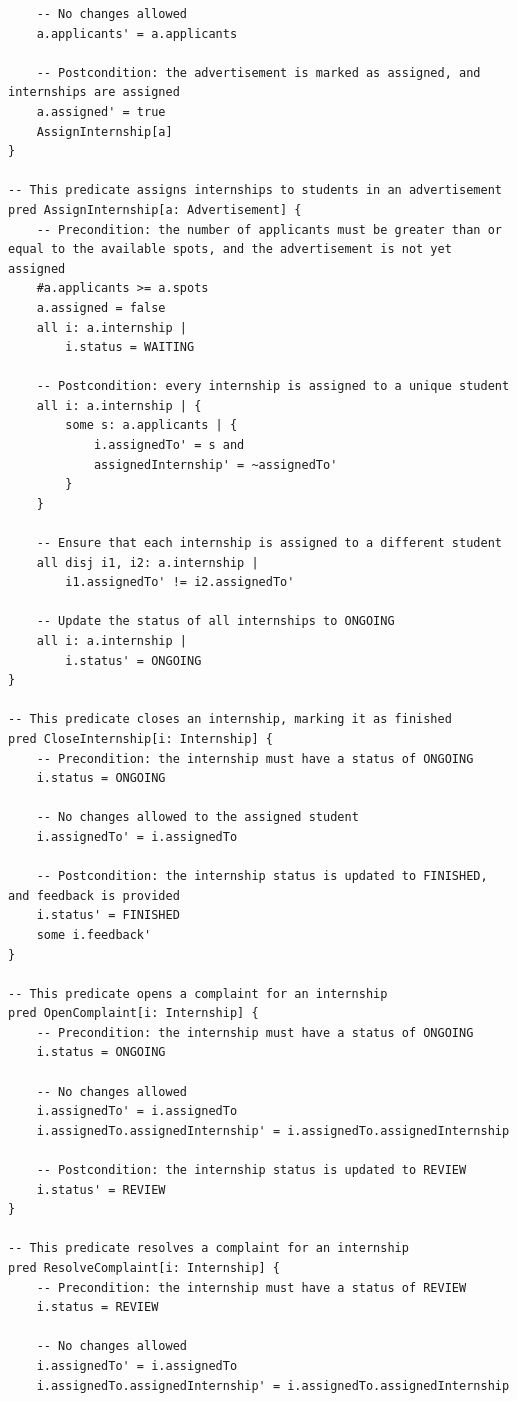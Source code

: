 \begin{lstlisting}
    -- No changes allowed 
    a.applicants' = a.applicants

    -- Postcondition: the advertisement is marked as assigned, and internships are assigned
    a.assigned' = true
    AssignInternship[a]
}

-- This predicate assigns internships to students in an advertisement
pred AssignInternship[a: Advertisement] {
    -- Precondition: the number of applicants must be greater than or equal to the available spots, and the advertisement is not yet assigned
    #a.applicants >= a.spots
    a.assigned = false
    all i: a.internship |
        i.status = WAITING

    -- Postcondition: every internship is assigned to a unique student
    all i: a.internship | {
        some s: a.applicants | {
            i.assignedTo' = s and
            assignedInternship' = ~assignedTo'
        }
    }

    -- Ensure that each internship is assigned to a different student
    all disj i1, i2: a.internship |
        i1.assignedTo' != i2.assignedTo'

    -- Update the status of all internships to ONGOING
    all i: a.internship |
        i.status' = ONGOING
}

-- This predicate closes an internship, marking it as finished
pred CloseInternship[i: Internship] {
    -- Precondition: the internship must have a status of ONGOING
    i.status = ONGOING

    -- No changes allowed to the assigned student
    i.assignedTo' = i.assignedTo

    -- Postcondition: the internship status is updated to FINISHED, and feedback is provided
    i.status' = FINISHED
    some i.feedback'
}

-- This predicate opens a complaint for an internship 
pred OpenComplaint[i: Internship] {
    -- Precondition: the internship must have a status of ONGOING
    i.status = ONGOING

    -- No changes allowed 
    i.assignedTo' = i.assignedTo
    i.assignedTo.assignedInternship' = i.assignedTo.assignedInternship

    -- Postcondition: the internship status is updated to REVIEW
    i.status' = REVIEW
}

-- This predicate resolves a complaint for an internship
pred ResolveComplaint[i: Internship] {
    -- Precondition: the internship must have a status of REVIEW
    i.status = REVIEW

    -- No changes allowed 
    i.assignedTo' = i.assignedTo
    i.assignedTo.assignedInternship' = i.assignedTo.assignedInternship


\end{lstlisting}
